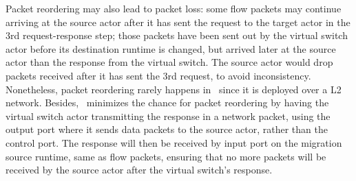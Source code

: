  Packet reordering may also lead to packet loss: some flow packets may continue arriving at the source actor after it has sent the request to the target actor in the 3rd request-response step; those packets have been sent out by the virtual switch actor before its destination runtime is changed, but arrived later at the source actor than the response from the virtual switch. %
 The source actor would drop packets received after it has sent the 3rd request, to avoid inconsistency. Nonetheless, packet reordering rarely happens in \nfactor~since it is deployed over a L2 network. Besides, \nfactor~minimizes the chance for packet reordering by having the virtual switch actor transmitting the response in a network packet, using the output port where it sends data packets to the source actor, rather than the control port. The response will then be received by input port on the migration source runtime, same as flow packets, ensuring that no more packets will be received by the source actor after the virtual switch's response.





